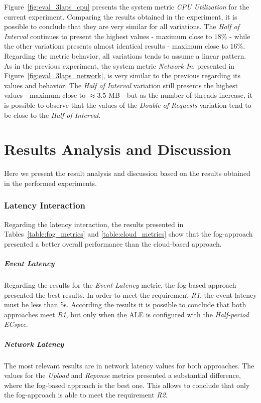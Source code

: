 Figure~\ref{fig:eval_3laps_cpu} presents the system metric \textit{CPU Utilization} for the current
experiment. Comparing the results obtained in the experiment, it is possible to conclude that
they are very similar for all variations. The \textit{Half of Interval} continues to present
the highest values - maximum close to $18\%$ - while the other variations presents almost identical
results - maximum close to $16\%$. Regarding the metric behavior, all variations tends to assume
a linear pattern.\\

As in the previous experiment, the system metric \textit{Network In}, presented in Figure~\ref{fig:eval_3laps_network},
is very similar to the previous regarding its values and behavior. The \textit{Half of Interval}
variation still presents the highest values - maximum close to $\approx3.5$ \gls{MB} - but as the number of
threads increase, it is possible to observe that the values of the \textit{Double of Requests}
variation tend to be close to the \textit{Half of Interval}.

\section{Results Analysis and Discussion}
\label{sec:eval_analysis}
Here we present the result analysis and discussion based on the results obtained in the performed
experiments.

\subsubsection{Latency Interaction}
\label{subs:eval_results_latency}
Regarding the latency interaction, the results presented in Tables~\ref{table:fog_metrics} and
\ref{table:cloud_metrics} show that the fog-approach presented a better overall performance than
the cloud-based approach.

\subparagraph{Event Latency}
\label{subp:eval_event_latency}
Regarding the results for the \textit{Event Latency} metric, the fog-based approach presented the
best results. In order to meet the requirement \textit{R1}, the event latency must be less than
5s. According the results it is possible to conclude that both approaches meet \textit{R1}, but only
when the \gls{ALE} is configured with the \textit{Half-period ECspec}.

\subparagraph{Network Latency}
\label{subp:eval_network_latency}
The most relevant results are in network latency values for both approaches. The values for the \textit{Upload}
and \textit{Reponse} metrics presented a substantial difference, where the fog-based approach is the
best one. This allows to conclude that only the fog-approach is able to meet the requirement \textit{R2}.\\

